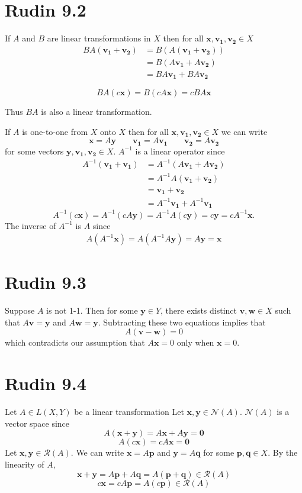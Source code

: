 \documentclass{article}
\begin{document}
\section*{Rudin 9.2}
If $A$ and $B$ are linear transformations in $X$ then for all $\bm{x}, \bm{v_1}, \bm{v_2} \in X$
\begin{align*}
  BA(\bm{v_1} + \bm{v_2}) &= B(A(\bm{v_1} + \bm{v_2})) \\
  &= B(A\bm{v_1} + A\bm{v_2}) \\
  &= BA\bm{v_1} + BA\bm{v_2} 
\end{align*}

\[
  BA(c\bm{x}) = B(cA\bm{x}) = cBA\bm{x}
\]

Thus $BA$ is also a linear transformation.

If $A$ is one-to-one from $X$ onto $X$ then for all $\bm{x}, \bm{v_1}, \bm{v_2} \in X$
we can write 
\[
  \bm{x} = A\bm{y} \qquad \bm{v_1} = A\bm{v_1} \qquad \bm{v_2} = A\bm{v_2}
\]
for some vectors $\bm{y}, \bm{v_1}, \bm{v_2} \in X$.
$A^{-1}$ is a linear operator since
\begin{align*}
  A^{-1}(\bm{v_1} + \bm{v_1}) &= A^{-1}(A\bm{v_1} + A\bm{v_2}) \\
  &= A^{-1}A(\bm{v_1} + \bm{v_2}) \\
  &= \bm{v_1} + \bm{v_2} \\
  &= A^{-1}\bm{v_1} + A^{-1}\bm{v_1}
\end{align*}
\[
  A^{-1}(c\bm{x}) =  A^{-1}(cA\bm{y}) = A^{-1}A(c\bm{y}) = c\bm{y} = cA^{-1}\bm{x}.
\]
The inverse of $A^{-1}$ is $A$ since 
\begin{align*}
  A(A^{-1}\bm{x}) =  A(A^{-1}A\bm{y}) = A\bm{y} = \bm{x}
\end{align*}
\newpage

\section*{Rudin 9.3}
Suppose $A$ is not 1-1. 
Then for some $\bm{y} \in Y$, there exists distinct $\bm{v}, \bm{w} \in X$
such that $A\bm{v} = \bm{y}$ and  $A\bm{w} = \bm{y}$.
Subtracting these two equations implies that
\[
  A(\bm{v}-\bm{w}) = 0
\]
which contradicts our assumption that $A\bm{x} = 0$ only when $\bm{x} = 0$.
\newpage

\section*{Rudin 9.4}
Let $A \in L(X, Y)$ be a linear transformation
Let $\bm{x}, \bm{y} \in \mathcal{N}(A)$.
$\mathcal{N}(A)$ is a vector space since 
\[
  A(\bm{x} + \bm{y}) = A\bm{x} + A\bm{y} = \bm{0}
\]
\[
  A(c\bm{x}) = cA\bm{x} = \bm{0}
\]
Let $\bm{x}, \bm{y} \in \mathcal{R}(A)$.
We can write $\bm{x} = A\bm{p}$ and $\bm{y} = A\bm{q}$
for some $\bm{p}, \bm{q} \in X$.
By the linearity of $A$,
\[
  \bm{x} + \bm{y} = A\bm{p} + A\bm{q} = A(\bm{p} + \bm{q}) \in \mathcal{R}(A)
\]
\[
  c\bm{x} = cA\bm{p} = A(c\bm{p}) \in \mathcal{R}(A)
\]
\newpage 
\end{document}
